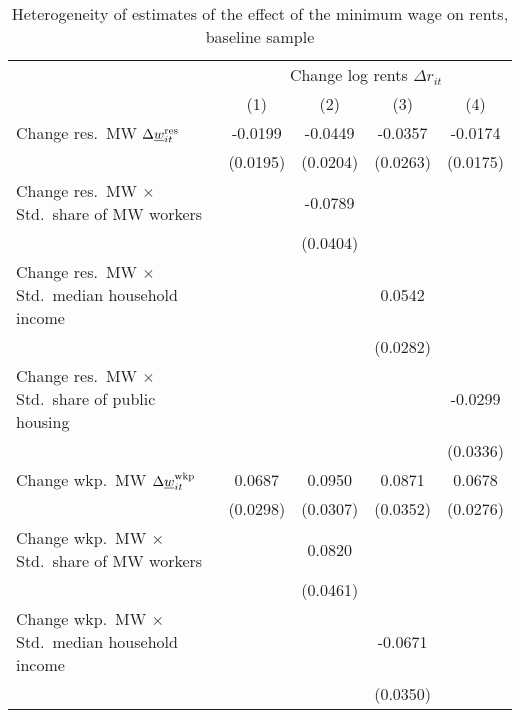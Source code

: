 \begin{table}[hbt!] \centering
    \caption{Heterogeneity of estimates of the effect of the minimum wage on rents, 
             baseline sample}
    \label{tab:heterogeneity}
    \begin{tabular}{@{}lcccc@{}}
        \toprule
            & \multicolumn{4}{c}{Change log rents $\Delta r_{it}$}                                                \\ \cmidrule(l){2-5} 
            & (1) & (2) & (3) & (4)                                                               \\ \midrule
        Change res.\ MW $\Delta\underline{w}_{it}^{\text{res}}$                &  -0.0199   &  -0.0449  &  -0.0357   &  -0.0174   \\
                                                               & (0.0195)  & (0.0204) & (0.0263)  & (0.0175)  \\
        Change res.\ MW $\times$ Std.\ share of MW workers     &        &  -0.0789  &        &        \\
                                                               &        & (0.0404) &        &        \\
        Change res.\ MW $\times$ Std.\ median household income &        &       &  0.0542   &        \\
                                                               &        &       & (0.0282)  &        \\
        Change res.\ MW $\times$ Std.\ share of public housing &        &       &        &  -0.0299   \\
                                                               &        &       &        & (0.0336)  \\
        Change wkp.\ MW $\Delta\underline{w}_{it}^{\text{wkp}}$                &  0.0687   &  0.0950  &  0.0871   &  0.0678   \\
                                                               & (0.0298)  & (0.0307) & (0.0352)  & (0.0276)  \\
        Change wkp.\ MW $\times$ Std.\ share of MW workers     &        &  0.0820  &        &        \\
                                                               &        & (0.0461) &        &        \\
        Change wkp.\ MW $\times$ Std.\ median household income &        &       &  -0.0671   &        \\
                                                               &        &       & (0.0350)  &        \\

\end{tabular}
\end{table}
